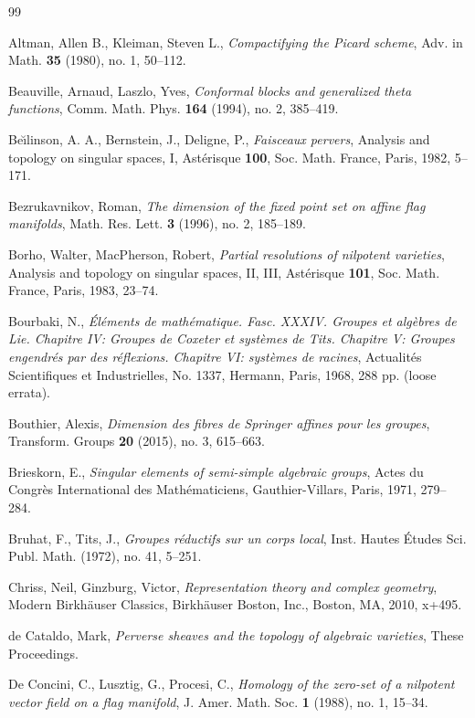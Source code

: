 \begin{thebibliography}{99}

 Altman, Allen B., Kleiman, Steven L., \emph{Compactifying the Picard scheme}, Adv. in Math. \textbf{35} (1980), no. 1, 50--112.

 Beauville, Arnaud, Laszlo, Yves, \emph{Conformal blocks and generalized theta functions}, Comm. Math. Phys. \textbf{164} (1994), no. 2, 385--419.

 Be{\u\i}linson, A. A., Bernstein, J., Deligne, P., \emph{Faisceaux pervers}, Analysis and topology on singular spaces, I, Ast\'erisque \textbf{100}, Soc. Math. France, Paris, 1982, 5--171.

 Bezrukavnikov, Roman, \emph{The dimension of the fixed point set on affine flag manifolds}, Math. Res. Lett. \textbf{3} (1996), no. 2, 185--189.

 Borho, Walter, MacPherson, Robert, \emph{Partial resolutions of nilpotent varieties}, Analysis and topology on singular spaces, II, III, Ast\'erisque \textbf{101}, Soc. Math. France, Paris, 1983, 23--74.

 Bourbaki, N., \emph{\'El\'ements de math\'ematique. Fasc. XXXIV. Groupes et alg\`ebres de Lie. Chapitre IV: Groupes de Coxeter et syst\`emes de Tits. Chapitre V: Groupes engendr\'es par des r\'eflexions. Chapitre VI: syst\`emes de racines}, Actualit\'es Scientifiques et Industrielles, No. 1337, Hermann, Paris, 1968, 288 pp. (loose errata).

 Bouthier, Alexis, \emph{Dimension des fibres de Springer affines pour les groupes}, Transform. Groups \textbf{20} (2015), no. 3, 615--663.

 Brieskorn, E., \emph{Singular elements of semi-simple algebraic groups}, Actes du Congr\`es International des Math\'ematiciens, Gauthier-Villars, Paris, 1971, 279--284.

 Bruhat, F., Tits, J., \emph{Groupes r\'eductifs sur un corps local}, Inst. Hautes \'Etudes Sci. Publ. Math. (1972), no. 41, 5--251.

 Chriss, Neil, Ginzburg, Victor, \emph{Representation theory and complex geometry}, Modern Birkh\"auser Classics, Birkh\"auser Boston, Inc., Boston, MA, 2010, x+495.

 de Cataldo, Mark, \emph{Perverse sheaves and the topology of algebraic varieties}, These Proceedings.

 De Concini, C., Lusztig, G., Procesi, C., \emph{Homology of the zero-set of a nilpotent vector field on a flag manifold}, J. Amer. Math. Soc. \textbf{1} (1988), no. 1, 15--34.


\end{thebibliography}
